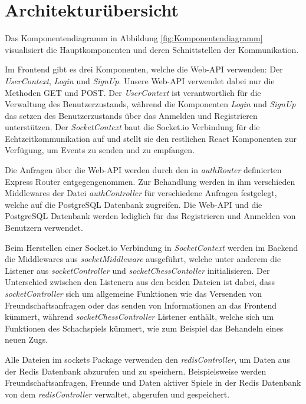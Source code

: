 \section{Architekturübersicht}
Das Komponentendiagramm in Abbildung \ref{fig:Komponentendiagramm} visualisiert die Hauptkomponenten und deren Schnittstellen der Kommunikation.

Im Frontend gibt es drei Komponenten, welche die Web-API verwenden: Der \textit{UserContext}, \textit{Login} und \textit{SignUp}. Unsere Web-API verwendet dabei nur die Methoden GET und POST. Der \textit{UserContext} ist verantwortlich für die Verwaltung des Benutzerzustands, während die Komponenten \textit{Login} und \textit{SignUp} das setzen des Benutzerzustands über das Anmelden und Registrieren unterstützen. Der \textit{SocketContext} baut die Socket.io Verbindung für die Echtzeitkommunikation auf und stellt sie den restlichen React Komponenten zur Verfügung, um Events zu senden und zu empfangen.

Die Anfragen über die Web-API werden durch den in \textit{authRouter} definierten Express Router entgegengenommen. Zur Behandlung werden in ihm verschieden Middlewares der Datei \textit{authController} für verschiedene Anfragen festgelegt, welche auf die PostgreSQL Datenbank zugreifen. Die Web-API und die PostgreSQL Datenbank werden lediglich für das Registrieren und Anmelden von Benutzern verwendet.

Beim Herstellen einer Socket.io Verbindung in \textit{SocketContext} werden im Backend die Middlewares aus \textit{socketMiddleware} ausgeführt, welche unter anderem die Listener aus \textit{socketController} und \textit{socketChessContoller} initialisieren. Der Unterschied zwischen den Listenern aus den beiden Dateien ist dabei, dass \textit{socketController} sich um allgemeine Funktionen wie das Versenden von Freundschaftsanfragen oder das senden von Informationen an das Frontend kümmert, während \textit{socketChessController} Listener enthält, welche sich um Funktionen des Schachspiels kümmert, wie zum Beispiel das Behandeln eines neuen Zugs. 

Alle Dateien im sockets Package verwenden den \textit{redisController}, um Daten aus der Redis Datenbank abzurufen und zu speichern. Beispielsweise werden Freundschaftsanfragen, Freunde und Daten aktiver Spiele in der Redis Datenbank von dem \textit{redisController} verwaltet, abgerufen und gespeichert.

